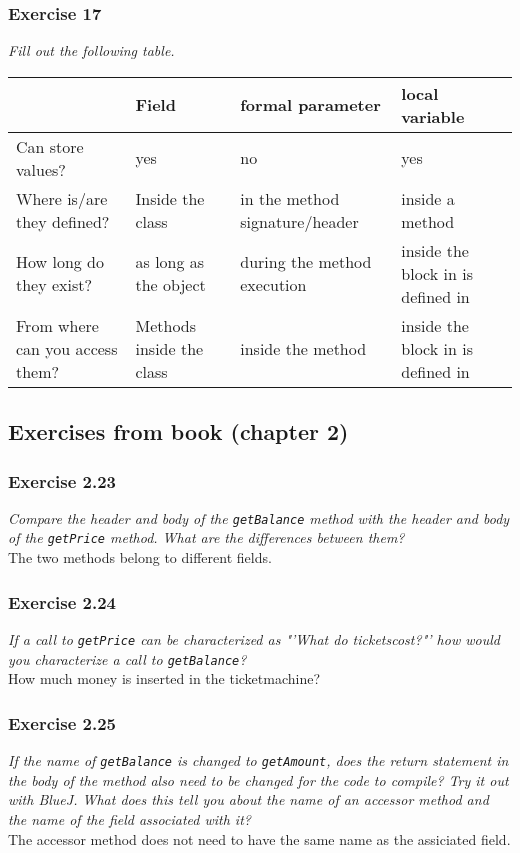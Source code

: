 \subsubsection*{Exercise 17}
\textit{Fill out the following table.}\\

\begin{table}
	\centering
	\begin{tabular}{p{} | p{} | p{} | p{}}
			& \textbf{Field} 
				& \textbf{formal parameter} 
					& \textbf{local variable} \\
		\hline
		\rowcolor{lgray}Can store values? 
			& yes
				& no
					& yes \\
		\rowcolor{white}Where is/are they defined?
			& Inside the class
				& in the method signature/header
					& inside a method \\
		\rowcolor{lgray}How long do they exist?
			& as long as the object
				& during the method execution
					& inside the block in is defined in \\
		\rowcolor{white}From where can you access them?
			& Methods inside the class
				& inside the method
					& inside the block in is defined in
	\end{tabular}
\end{table}

\subsection{Exercises from book (chapter 2)}
\subsubsection*{Exercise 2.23}
\textit{Compare the header and body of the \lstinline?getBalance? method with 
the header and body of the \lstinline?getPrice? method. What are the 
differences between them? }\\
The two methods belong to different fields. 

\subsubsection*{Exercise 2.24}
\textit{If a call to \lstinline?getPrice? can be characterized as 
"'What do ticketscost?"' how would you characterize a call to 
\lstinline?getBalance?? }\\
How much money is inserted in the ticketmachine? 

\subsubsection*{Exercise 2.25}
\textit{If the name of \lstinline?getBalance? is changed to 
\lstinline?getAmount?, does the return statement in the body of the method 
also need to be changed for the code to compile? Try it out with BlueJ. What 
does this tell you about the name of an accessor method and the name of the 
field associated with it? }\\
The accessor method does not need to have the same name as the assiciated 
field. 

